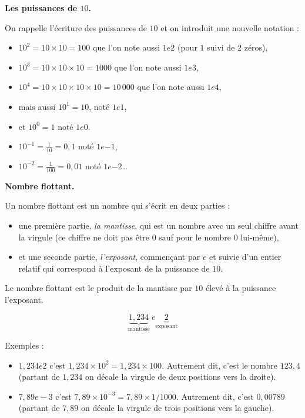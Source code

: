 \documentclass[class=report,crop=false, 12pt]{standalone}
\begin{document}
\begin{activite}

\textbf{Les puissances de $10$.}

On rappelle l'écriture des puissances de $10$ et on introduit une nouvelle notation :
\begin{itemize}
  \item $10^2 = 10 \times 10 = 100$ que l'on note aussi $1e2$ (pour $1$ suivi de $2$ zéros),
  \item $10^3 = 10 \times 10 \times 10 = 1000$ que l'on note aussi $1e3$,  
  \item $10^4 = 10 \times 10 \times 10 \times 10 = 10\,000$ que l'on note aussi $1e4$, 
  \item mais aussi $10^1 = 10$, noté $1e1$,
  \item et $10^0 = 1$ noté $1e0$.
  \item $10^{-1}=\frac{1}{10}=0,1$ noté $1e{-1}$,
  \item $10^{-2}=\frac{1}{100}=0,01$ noté $1e{-2}$\ldots    
\end{itemize}

\bigskip
\textbf{Nombre flottant.}

Un nombre flottant est un nombre qui s'écrit en deux parties : 
\begin{itemize}
  \item une première partie, \emph{la mantisse}, qui est un nombre avec un seul chiffre avant la virgule (ce chiffre ne doit pas être $0$ sauf pour le nombre $0$ lui-même),
  \item et une seconde partie, \emph{l'exposant}, commençant par $e$ et suivie d'un entier relatif qui correspond à l'exposant de la puissance de $10$.
\end{itemize} 
Le nombre flottant est le produit de la mantisse par $10$ élevé à la puissance l'exposant.


$$\underbrace{1,234}_{\text{mantisse}} \ e\underbrace{2}_{\text{exposant}}$$

Exemples :
\begin{itemize}
  \item $1,234e2$ c'est $1,234 \times 10^2 = 1,234 \times 100$. Autrement dit, c'est le nombre $123,4$ (partant de $1,234$ on décale la virgule de deux positions vers la droite).
  
  \item $7,89e-3$ c'est $7,89 \times 10^{-3} = 7,89 \times 1/1000$. Autrement dit, c'est $0,00789$ (partant de $7,89$ on décale la virgule de trois positions vers la gauche).


\end{itemize}
\end{activite}
\end{document}
